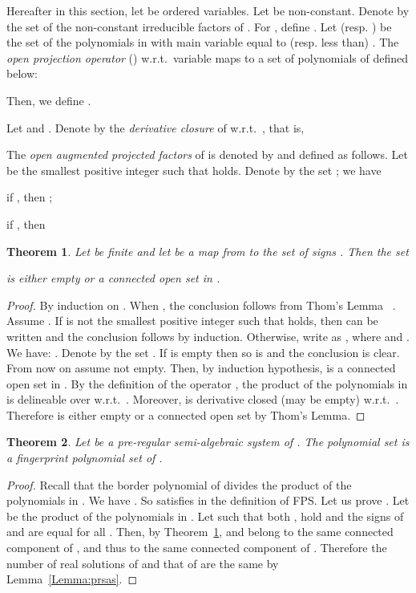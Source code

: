 \documentclass{sig-alternate}
\newtheorem{Theorem}{Theorem}
\begin{document}
\smallskip{}
Hereafter in this section, let  be ordered variables.
Let  be non-constant.
Denote by  the set
of the non-constant irreducible factors of .
For , define .
Let  (resp. ) be the set of the
polynomials in  with
main variable equal to (resp. less than) . 
The {\em open projection operator} () w.r.t.\ variable 
maps  to
a set of polynomials of  defined below:

Then, we define .

\smallskip{}
Let  and .
Denote by   the {\em derivative closure} of  w.r.t.\ , 
that is,

The \emph{open augmented projected factors} of  is denoted by 
and defined as follows. 
Let  be the smallest positive integer such that
 holds.
Denote by  the set
; we have
\begin{itemizeshort}
\item if , then ;
\item if ,  then 
		
\end{itemizeshort}

\begin{Theorem}
\label{thm:oap}
Let  be finite and let  be a map from
 to the set of signs .
Then the set 

is either empty or a connected open set in .
\end{Theorem}
\begin{proof}
By induction on .
When , the conclusion follows from Thom's Lemma
~\cite{BPR06}.
Assume . 
If  is not the smallest positive integer  such that
 holds, then
  can be written 
 and the conclusion follows by induction.
Otherwise, write   as , 
where  and .
We have: . 
Denote by  the set 
.
If  is empty then so is  and the conclusion is clear.
From now on assume  not empty. Then, 
by induction hypothesis,  is 
a connected open set in .
By the definition of the operator ,
the product of the polynomials in  is
delineable over  w.r.t.\ .
Moreover,   is derivative closed (may be empty) w.r.t.\ .
Therefore 
is either empty or a 
connected open set by Thom's Lemma.
\end{proof}

\begin{Theorem}
\label{thm:dpoap}
Let  be a pre-regular semi-algebraic system of .
The polynomial set  is a fingerprint polynomial set of .
\end{Theorem}
\begin{proof}
Recall that the border polynomial  of 
divides the product of the polynomials in . 
We have . 
So  satisfies  in the definition of {\small FPS}.
Let us prove .
Let  be the product of the polynomials in .
Let  
such that both ,  hold 
and the signs of  and  are equal for
all .
Then, by Theorem~\ref{thm:oap},   and  
belong to the same connected component of ,
and thus to the same connected component of .
Therefore the number of real solutions of  and that of 
are the same by Lemma~\ref{Lemma:prsas}.
\end{proof}
\end{document}
